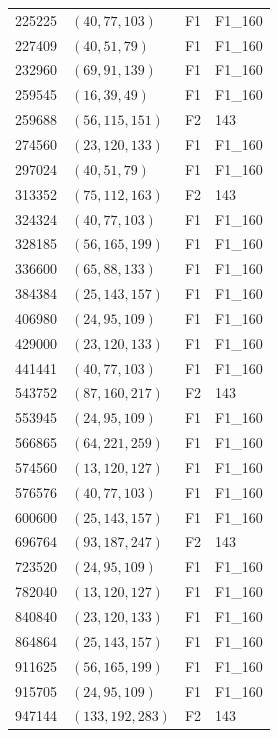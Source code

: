 \documentclass[11pt,reqno]{amsart}
\theoremstyle{plain}
\theoremstyle{definition}
\begin{document}
\begin{longtable}{rlll}
225225 & $(40,77,103)$ & F1 & F1\_160 \\
227409 & $(40,51,79)$ & F1 & F1\_160 \\
232960 & $(69,91,139)$ & F1 & F1\_160 \\
259545 & $(16,39,49)$ & F1 & F1\_160 \\
259688 & $(56,115,151)$ & F2 & 143 \\
274560 & $(23,120,133)$ & F1 & F1\_160 \\
297024 & $(40,51,79)$ & F1 & F1\_160 \\
313352 & $(75,112,163)$ & F2 & 143 \\
324324 & $(40,77,103)$ & F1 & F1\_160 \\
328185 & $(56,165,199)$ & F1 & F1\_160 \\
336600 & $(65,88,133)$ & F1 & F1\_160 \\
384384 & $(25,143,157)$ & F1 & F1\_160 \\
406980 & $(24,95,109)$ & F1 & F1\_160 \\
429000 & $(23,120,133)$ & F1 & F1\_160 \\
441441 & $(40,77,103)$ & F1 & F1\_160 \\
543752 & $(87,160,217)$ & F2 & 143 \\
553945 & $(24,95,109)$ & F1 & F1\_160 \\
566865 & $(64,221,259)$ & F1 & F1\_160 \\
574560 & $(13,120,127)$ & F1 & F1\_160 \\
576576 & $(40,77,103)$ & F1 & F1\_160 \\
600600 & $(25,143,157)$ & F1 & F1\_160 \\
696764 & $(93,187,247)$ & F2 & 143 \\
723520 & $(24,95,109)$ & F1 & F1\_160 \\
782040 & $(13,120,127)$ & F1 & F1\_160 \\
840840 & $(23,120,133)$ & F1 & F1\_160 \\
864864 & $(25,143,157)$ & F1 & F1\_160 \\
911625 & $(56,165,199)$ & F1 & F1\_160 \\
915705 & $(24,95,109)$ & F1 & F1\_160 \\
947144 & $(133,192,283)$ & F2 & 143 \\
\hline
\end{longtable}
\end{document}
